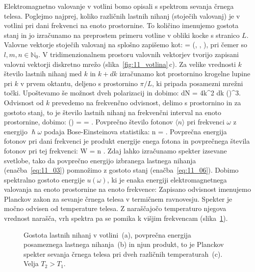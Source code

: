 Elektromagnetno valovanje v votlini bomo opisali s spektrom sevanja
črnega telesa. Poglejmo najprej, koliko različnih lastnih nihanj
(stoječih valovanj) je v votlini pri dani frekvenci na enoto prostornine.
To količino imenujemo gostota stanj in jo izračunamo na preprostem primeru
votline v obliki kocke s stranico $L$. Valovne vektorje stoječih valovanj 
na splošno zapišemo kot:
\beq
{} = \left(, , \right)\!\!,
\label{eq:11_04}
\eeq
pri čemer so $l,m,n \in \mathbb{N}_0$. V tridimenzionalnem prostoru
valovnih vektorjev tvorijo zapisani valovni vektorji diskretno 
mrežo (slika~\ref{fig:11_votlina}\,c). Za velike vrednosti $k$ 
število lastnih nihanj 
med $k$ in $k+dk$ izračunamo kot prostornino krogelne 
lupine pri $k$ v prvem oktantu, deljeno s prostornino $\pi/L$, 
ki pripada posamezni  mrežni točki. Upoštevamo še možnost dveh polarizacij 
in dobimo:
\beq
dN = 4\pi k^2 dk \left(\right)^3\!\!.
\label{eq:11_05}
\eeq
Odvisnost od $k$ prevedemo na frekvenčno odvisnost, delimo s prostornino
in za gostoto stanj, to je število lastnih nihanj na frekvenčni interval
na enoto prostornine, dobimo:
\beq
\varrho (\omega) =  = .
\label{eq:11_06}
\eeq
Povprečno število fotonov $\langle n \rangle$ pri frekvenci $\omega$
z energijo $\hslash \omega$ podaja 
Bose-Einsteinova statistika:
\beq
\langle n \rangle = .
\label{eq:11_02}
\eeq
Povprečna energija fotonov pri dani frekvenci je produkt energije enega fotona
in povprečnega števila fotonov pri tej frekvenci:
\beq
\langle W \rangle = \hslash \omega \langle n \rangle.
\label{eq:11_03}
\eeq
Zdaj lahko izračunamo spekter izsevane svetlobe, tako da povprečno 
energijo izbranega lastnega nihanja (enačba~\ref{eq:11_03}) 
pomnožimo z gostoto stanj (enačba~\ref{eq:11_06}). Dobimo spektralno 
gostoto energije $u(\omega)$, ki je enaka energiji 
elektromagnetnega valovanja na enoto prostornine na enoto frekvence:
Zapisano odvisnost imenujemo Planckov zakon za sevanje črnega telesa 
v termičnem ravnovesju. Spekter je močno odvisen od temperature telesa. Z naraščajočo
temperaturo njegova vrednost narašča, vrh spektra pa se pomika k višjim
frekvencam (slika~\ref{fig:11_Planck}).
\begin{figure}[h!]
\centering
\def\svgwidth{140truemm} 

\caption{Gostota lastnih nihanj v votlini~(a), 
povprečna energija posameznega lastnega nihanja~(b) 
in njun produkt, to je 
Planckov spekter sevanja črnega telesa pri dveh različnih 
temperaturah~(c). Velja $T_2>T_1$.
}
\label{fig:11_Planck}
\end{figure}

